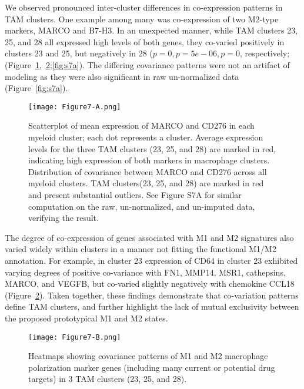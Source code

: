 We observed pronounced inter-cluster differences in co-expression patterns in TAM clusters.
One example among many was co-expression of two M2-type markers, MARCO and B7-H3.
In an unexpected manner, while TAM clusters 23, 25, and 28 all expressed high levels of both genes, they co-varied positively in clusters 23 and 25, but negatively in 28 ($p=0, p=5e-06, p=0$, respectively; (Figure~\ref{fig:7a},~\ref{fig:7b};\ref{fig:s7a}).
The differing covariance patterns were not an artifact of modeling as they were also significant in raw un-normalized data (Figure~\ref{fig:s7a}).

\begin{figure}
\centering
\texttt{[image: Figure7-A.png]}
\caption{Scatterplot of mean expression of MARCO and CD276 in each myeloid cluster; each dot represents a cluster.
  Average expression levels for the three TAM clusters (23, 25, and 28) are marked in red, indicating high expression of both markers in macrophage clusters.
Distribution of covariance between MARCO and CD276 across all myeloid clusters.
TAM clusters(23, 25, and 28) are marked in red and present substantial outliers.
See Figure S7A for similar computation on the raw, un-normalized, and un-imputed data, verifying the result.
}
\label{fig:7a}
\end{figure}

The degree of co-expression of genes associated with M1 and M2 signatures also varied widely within clusters in a manner not fitting the functional M1/M2 annotation.
For example, in cluster 23 expression of CD64 in cluster 23 exhibited varying degrees of positive co-variance with FN1, MMP14, MSR1, cathepsins, MARCO, and VEGFB, but co-varied slightly negatively with chemokine CCL18 (Figure~\ref{fig:7b}).
Taken together, these findings demonstrate that co-variation patterns define TAM clusters, and further highlight the lack of mutual exclusivity between the proposed prototypical M1 and M2 states.

\begin{figure}
\centering
\texttt{[image: Figure7-B.png]}
\caption{Heatmaps showing covariance patterns of M1 and M2 macrophage polarization marker genes (including many current or potential drug targets) in 3 TAM clusters (23, 25, and 28).
}
\label{fig:7b}
\end{figure}

